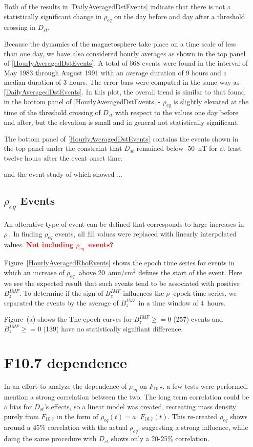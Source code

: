 \documentclass[10pt,twocolumn]{article}
\newcommand{\vinote}[1]{\textcolor{red}{\textbf{#1}}} %
\newcommand{\req}{\ensuremath{\rho_{eq}}}
\newcommand{\inote}[1]{\textcolor{blue}{\textbf{#1}}} %
\def\note#1\par{\textcolor{blue}{\textbf{#1}}\\}
\begin{document}
Both of the results in \ref{DailyAveragedDstEvents} indicate that there is not a statistically significant change in $\rho_{eq}$ on the day before and day after a threshold crossing in $D_{st}$.  

Because the dynamics of the magnetosphere take place on a time scale of less than one day, we have also considered hourly averages as shown in the top panel of \ref{HourlyAveragedDstEvents}.  A total of 668 events were found in the interval of May 1983 through August 1991 with an average duration of 9 hours and a median duration of 3 hours.  The error bars were computed in the same way as \ref{DailyAveragedDstEvents}.  In this plot, the overall trend is similar to that found in the bottom panel of \ref{HourlyAveragedDstEvents} - $\rho_{eq}$ is slightly elevated at the time of the threshold crossing of $D_{st}$ with respect to the values one day before and after, but the elevation is small and in general not statistically significant.

The bottom panel of \ref{HourlyAveragedDstEvents} contains the events shown in the top panel under the constraint that $D_{st}$ remained below -50~nT for at least twelve hours after the event onset time.

and the event study of \cite{Yao2008} which showed ...

\subsection{$\rho_{eq}$ Events}

An alterntive type of event can be defined that corresponds to large increases in $\rho\ $.  In finding $\rho_{eq}$ events, all fill values were replaced with linearly interpolated values. \vinote{Not including \req\ events?}

Figure~\ref{HourlyAveragedRhoEvents} shows the epoch time series for events in which an increase of $\req\ $ above $20$~amu/cm$^2$ defines the start of the event.  Here we see the expected result that such events tend to be associated with positive $B_z^{IMF}$.  To determine if the sign of $B_z^{IMF}$ influences the $\rho\ $ epoch time series, we separated the events by the average of $B_z^{IMF}$ in a time window of $4$~hours.  

Figure~\label{fig:RhoBinned}(a) shows the 
The epoch curves for $B_z^{IMF}\geq=0$ (257) events and $B_z^{IMF}\ge=0$ (139) have no statistically signifiant difference.

\section{F10.7 dependence}
In an effort to analyze the dependence of $\rho_{eq}$ on $F_{10.7}$, a few tests were performed. \cite{Takahashi2010} mention a strong correlation between the two. The long term correlation could be a bias for $D_{st}$'s effects, so a linear model was created, recreating mass density purely from $F_{10.7}$ in the form of $\rho_{eq}(t)=a\cdot F_{10.7}(t)$. This re-created $\rho_{eq}$ shows around a 45\% correlation with the actual $\rho_{eq}$, suggesting a strong influence, while doing the same procedure with $D_{st}$ shows only a 20-25\% correlation. 
\end{document}
